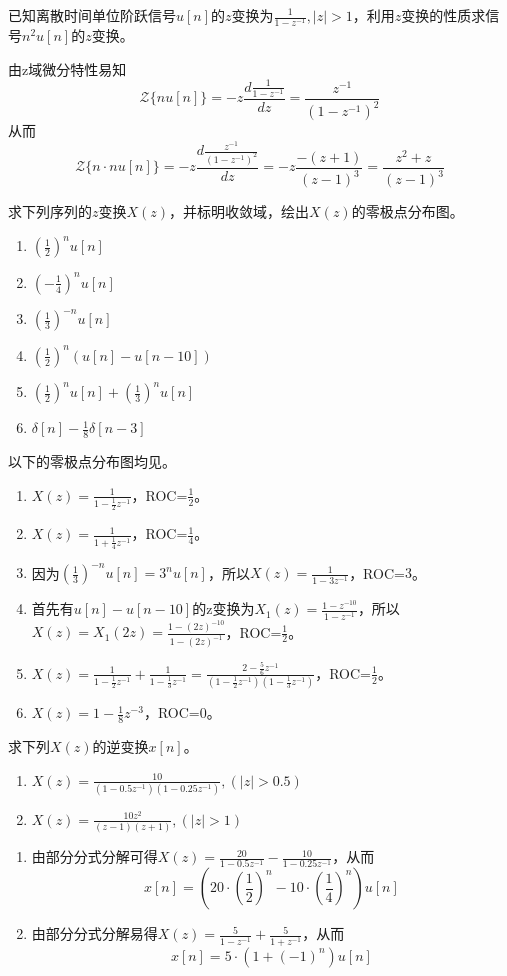 \documentclass[answers]{exam}  %
\begin{document}
\begin{questions}
\question 已知离散时间单位阶跃信号$u[n]$的$z$变换为$\frac{1}{1-z^{-1}},|z|>1$，利用$z$变换的性质求信号$n^2u[n]$的$z$变换。
\begin{solution}
由z域微分特性易知$$\mathcal{Z}\{nu[n]\}=-z\frac{d\frac{1}{1-z^{-1}}}{dz}=\frac{z^{-1}}{(1-z^{-1})^2}$$从而$$\mathcal{Z}\{n\cdot nu[n]\}=-z\frac{d\frac{z^{-1}}{(1-z^{-1})^2}}{dz}=-z\frac{-(z+1)}{(z-1)^3}=\frac{z^2+z}{(z-1)^3}$$ 
\end{solution}

\question 求下列序列的$z$变换$X(z)$，并标明收敛域，绘出$X(z)$的零极点分布图。
\begin{enumerate}[(1)]
\item $\left(\frac{1}{2}\right)^nu[n]$
\item $\left(-\frac{1}{4}\right)^nu[n]$
\item $\left(\frac{1}{3}\right)^{-n}u[n]$
\item $\left(\frac{1}{2}\right)^n(u[n]-u[n-10])$
\item $\left(\frac{1}{2}\right)^nu[n]+\left(\frac{1}{3}\right)^nu[n]$
\item $\delta[n]-\frac{1}{8}\delta[n-3]$
\end{enumerate}
\begin{solution}以下的零极点分布图均见。
\begin{enumerate}[(1)]
	\item $X(z)=\frac{1}{1-\frac{1}{2}z^{-1}}$，ROC=$\frac{1}{2}$。
	\item $X(z)=\frac{1}{1+\frac{1}{4}z^{-1}}$，ROC=$\frac{1}{4}$。
	\item 因为$(\frac{1}{3})^{-n}u[n]=3^{n}u[n]$，所以$X(z)=\frac{1}{1-3z^{-1}}$，ROC=$3$。
	\item 首先有$u[n]-u[n-10]$的z变换为$X_1(z)=\frac{1-z^{-10}}{1-z^{-1}}$，所以$X(z)=X_1(2z)=\frac{1-(2z)^{-10}}{1-(2z)^{-1}}$，ROC=$\frac{1}{2}$。
	\item $X(z)=\frac{1}{1-\frac{1}{2}z^{-1}}+\frac{1}{1-\frac{1}{3}z^{-1}}=\frac{2-\frac{5}{6}z^{-1}}{(1-\frac{1}{2}z^{-1})(1-\frac{1}{3}z^{-1})}$，ROC=$\frac{1}{2}$。
	\item $X(z)=1-\frac{1}{8}z^{-3}$，ROC=$0$。
\end{enumerate}
\end{solution}

\question 求下列$X(z)$的逆变换$x[n]$。
\begin{enumerate}[(1)]
\item $X(z)=\frac{10}{(1-0.5z^{-1})(1-0.25z^{-1})},(|z|>0.5)$
\item $X(z)=\frac{10z^2}{(z-1)(z+1)},(|z|>1)$
\end{enumerate}
\begin{solution}
\begin{enumerate}[(1)]
	\item 由部分分式分解可得$X(z)=\frac{20}{1-0.5z^{-1}}-\frac{10}{1-0.25z^{-1}}$，从而$$x[n]=(20\cdot(\frac{1}{2})^n-10\cdot(\frac{1}{4})^n)u[n]$$
	\item 由部分分式分解易得$X(z)=\frac{5}{1-z^{-1}}+\frac{5}{1+z^{-1}}$，从而$$x[n]=5\cdot(1+(-1)^n)u[n]$$
\end{enumerate}
\end{solution}


\end{questions}
\end{document}
